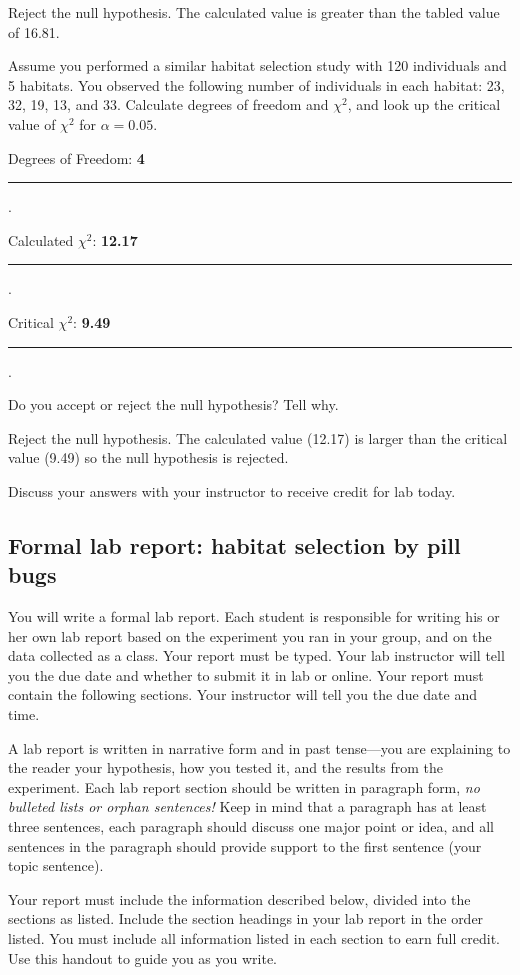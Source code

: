 \documentclass[12pt, hidelinks]{exam}
\newcommand*\AnswerBox[2]{%
    \parbox[t][#1]{0.92\textwidth}{%
    \begin{solution}#2\end{solution}}
    \vspace{\stretch{1}}
}
\newlength{\basespace}
\newcommand\chisq{$\chi^2$}
\newcommand*\AnswerBlank[1]{%
	\ifprintanswers%
		\textbf{#1}
	\else%
		\rule{0.75in}{0.4pt}\kern0.67pt.\fi%
	}
\begin{document}
\begin{questions}
	\AnswerBox{2\basespace}{Reject the null hypothesis. The calculated value is greater than the tabled value of 16.81.}

	\question[Checkout]
	Assume you performed a similar habitat selection study with 120 individuals and 5 habitats. You observed the following number of individuals in each habitat: 23, 32, 19, 13, and 33. Calculate degrees of freedom and \chisq{}, and look up the critical value of \chisq{} for $\alpha = 0.05$.\bigskip
	
	Degrees of Freedom: \AnswerBlank{4} \bigskip 
	
	Calculated \chisq{}: \AnswerBlank{12.17} \bigskip
	
	Critical \chisq{}: \AnswerBlank{9.49}
	
	\question[Checkout]
	Do you accept or reject the null hypothesis?  Tell why.
	
	\AnswerBox{\basespace}{%
		Reject the null hypothesis. The calculated value (12.17) is larger than the critical value (9.49) so the null hypothesis is rejected.
	}
		
	Discuss your answers with your instructor to receive credit for lab today.
	
\end{questions}
	

\subsection*{Formal lab report: habitat selection by pill bugs}

You will write a formal lab report. Each student is responsible for writing his or her own lab report based on
the experiment you ran in your group, and on the data collected as a
class. Your report must be typed. Your lab instructor will tell you the due date and whether to submit it in lab or online. Your report must contain the following sections. Your instructor will tell you the due date and time.
 
A lab report is written in narrative form and in past tense—you are
explaining to the reader your hypothesis, how you tested it, and the
results from the experiment. Each lab report section should be written
in paragraph form, \emph{no bulleted lists or orphan sentences!} Keep in
mind that a paragraph has at least three sentences, each paragraph should
discuss one major point or idea, and all sentences in the paragraph
should provide support to the first sentence (your topic sentence).

Your report must include the information described below, divided into the
sections as listed. Include the section headings in your lab report in the order listed. You must 
include all information listed in each section to earn full credit. 
Use this handout to guide you as you write.
\end{document}
